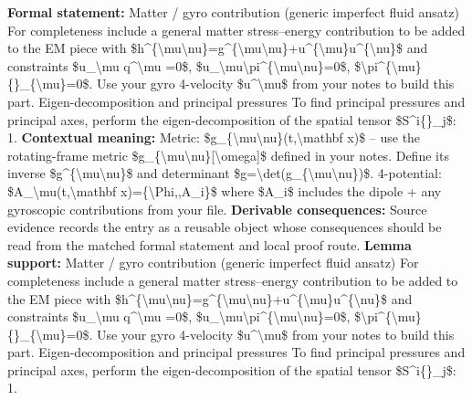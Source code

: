 \begingroup\footnotesize\setlength{\emergencystretch}{3em}\sloppy
\textbf{Formal statement:} Matter / gyro contribution (generic imperfect fluid ansatz) For completeness include a general matter stress--energy contribution to be added to the EM piece with \$h\textasciicircum{}\{\textbackslash{}mu\textbackslash{}nu\}=g\textasciicircum{}\{\textbackslash{}mu\textbackslash{}nu\}+u\textasciicircum{}\{\textbackslash{}mu\}u\textasciicircum{}\{\textbackslash{}nu\}\$ and constraints \$u\_\textbackslash{}mu q\textasciicircum{}\textbackslash{}mu =0\$, \$u\_\textbackslash{}mu\textbackslash{}pi\textasciicircum{}\{\textbackslash{}mu\textbackslash{}nu\}=0\$, \$\textbackslash{}pi\textasciicircum{}\{\textbackslash{}mu\}\{\}\_\{\textbackslash{}mu\}=0\$. Use your gyro 4-velocity \$u\textasciicircum{}\textbackslash{}mu\$ from your notes to build this part. Eigen-decomposition and principal pressures To find principal pressures and principal axes, perform the eigen-decomposition of the spatial tensor \$S\textasciicircum{}i\{\}\_j\$: 1.
\textbf{Contextual meaning:} Metric: \$g\_\{\textbackslash{}mu\textbackslash{}nu\}(t,\textbackslash{}mathbf x)\$ -- use the rotating-frame metric \$g\_\{\textbackslash{}mu\textbackslash{}nu\}[\textbackslash{}omega]\$ defined in your notes. Define its inverse \$g\textasciicircum{}\{\textbackslash{}mu\textbackslash{}nu\}\$ and determinant \$g=\textbackslash{}det(g\_\{\textbackslash{}mu\textbackslash{}nu\})\$. 4-potential: \$A\_\textbackslash{}mu(t,\textbackslash{}mathbf x)=\{\textbackslash{}Phi,,A\_i\}\$ where \$A\_i\$ includes the dipole + any gyroscopic contributions from your file.
\textbf{Derivable consequences:} Source evidence records the entry as a reusable object whose consequences should be read from the matched formal statement and local proof route.
\textbf{Lemma support:} Matter / gyro contribution (generic imperfect fluid ansatz) For completeness include a general matter stress--energy contribution to be added to the EM piece with \$h\textasciicircum{}\{\textbackslash{}mu\textbackslash{}nu\}=g\textasciicircum{}\{\textbackslash{}mu\textbackslash{}nu\}+u\textasciicircum{}\{\textbackslash{}mu\}u\textasciicircum{}\{\textbackslash{}nu\}\$ and constraints \$u\_\textbackslash{}mu q\textasciicircum{}\textbackslash{}mu =0\$, \$u\_\textbackslash{}mu\textbackslash{}pi\textasciicircum{}\{\textbackslash{}mu\textbackslash{}nu\}=0\$, \$\textbackslash{}pi\textasciicircum{}\{\textbackslash{}mu\}\{\}\_\{\textbackslash{}mu\}=0\$. Use your gyro 4-velocity \$u\textasciicircum{}\textbackslash{}mu\$ from your notes to build this part. Eigen-decomposition and principal pressures To find principal pressures and principal axes, perform the eigen-decomposition of the spatial tensor \$S\textasciicircum{}i\{\}\_j\$: 1.\par
\endgroup

